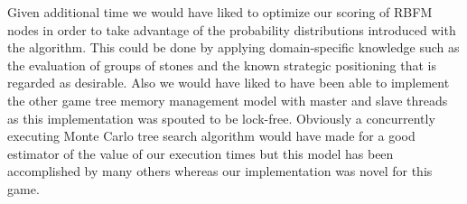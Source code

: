 \documentclass[conference]{IEEEtran}
\begin{document}
Given additional time we would have liked to optimize our scoring of RBFM nodes in order to take advantage of the probability distributions introduced with the algorithm. This could be done by applying domain-specific knowledge such as the evaluation of groups of stones and the known strategic positioning that is regarded as desirable. Also we would have liked to have been able to implement the other game tree memory management model with master and slave threads as this implementation was spouted to be lock-free. Obviously a concurrently executing Monte Carlo tree search algorithm would have made for a good estimator of the value of our execution times but this model has been accomplished by many others whereas our implementation was novel for this game.



\end{document}

